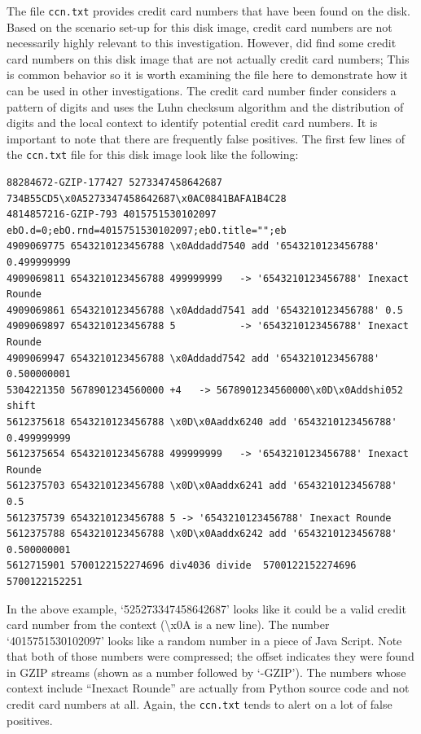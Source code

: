 The file \texttt{ccn.txt} provides credit card numbers that have been found on the disk. Based on the scenario set-up for this disk image, credit card numbers are not necessarily highly relevant to this investigation. However, \bulk did find some credit card numbers on this disk image that are not actually credit card numbers; This is common behavior so it is worth examining the file here to demonstrate how it can be used in other investigations. The credit card number finder considers a pattern of digits and uses the Luhn checksum algorithm and the distribution of digits and the local context to identify potential credit card numbers. It is important to note that there are frequently false positives. The first few lines of the \texttt{ccn.txt} file for this disk image look like the following:
\lstset{style=customfile}
\begin{lstlisting}
88284672-GZIP-177427 5273347458642687 734B55CD5\x0A5273347458642687\x0AC0841BAFA1B4C28
4814857216-GZIP-793 4015751530102097 ebO.d=0;ebO.rnd=4015751530102097;ebO.title="";eb
4909069775 6543210123456788	\x0Addadd7540 add '6543210123456788' 0.499999999   
4909069811 6543210123456788 499999999   -> '6543210123456788' Inexact Rounde
4909069861 6543210123456788 \x0Addadd7541 add '6543210123456788' 0.5           
4909069897 6543210123456788 5           -> '6543210123456788' Inexact Rounde
4909069947 6543210123456788 \x0Addadd7542 add '6543210123456788' 0.500000001   
5304221350 5678901234560000 +4   -> 5678901234560000\x0D\x0Addshi052 shift
5612375618 6543210123456788 \x0D\x0Aaddx6240 add '6543210123456788' 0.499999999   
5612375654 6543210123456788 499999999   -> '6543210123456788' Inexact Rounde
5612375703 6543210123456788 \x0D\x0Aaddx6241 add '6543210123456788' 0.5           
5612375739 6543210123456788 5 -> '6543210123456788' Inexact Rounde
5612375788 6543210123456788 \x0D\x0Aaddx6242 add '6543210123456788' 0.500000001   
5612715901 5700122152274696 div4036 divide  5700122152274696   5700122152251
\end{lstlisting}
In the above example, `525273347458642687' looks like it could be a valid credit card number from the context (\textbackslash x0A is a new line). The number `4015751530102097' looks like a random number in a piece of Java Script. Note that both of those numbers were compressed; the offset indicates they were found in GZIP streams (shown as a number followed by `-GZIP'). The numbers whose context include ``Inexact Rounde'' are actually from Python source code and not credit card numbers at all. Again, the \texttt{ccn.txt} tends to alert on a lot of false positives. \\ 


